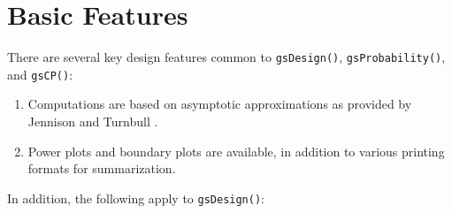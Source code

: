 \section{Basic Features\label{sec:basicfeatures}}

There are several key design features common to \texttt{gsDesign()},
\texttt{gsProbability()}, and \texttt{gsCP()}:

\begin{enumerate}
\item Computations are based on asymptotic approximations as provided by
Jennison and Turnbull \cite{JTBook}.

\item Power plots and boundary plots are available, in addition to various
printing formats for summarization.
\end{enumerate}

In addition, the following apply to \texttt{gsDesign()}:

